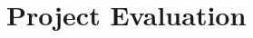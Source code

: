 \documentclass[12pt,a4paper]{report}
\theoremstyle{definition}
\begin{document}
\chapter{Project Evaluation}





\newpage



\newpage
\end{document}
